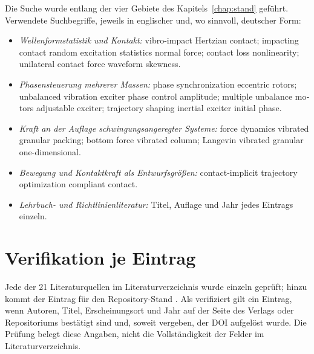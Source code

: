 \documentclass[12pt,a4paper]{report}
\begin{document}
Die Suche wurde entlang der vier Gebiete des Kapitels~\ref{chap:stand}
geführt. Verwendete Suchbegriffe, jeweils in englischer und, wo
sinnvoll, deutscher Form:

\begin{itemize}
\item \emph{Wellenformstatistik und Kontakt:} \foreignlanguage{english}{vibro-impact Hertzian
      contact; impacting contact random excitation statistics normal
      force; contact loss nonlinearity; unilateral contact force
      waveform skewness.}
\item \emph{Phasensteuerung mehrerer Massen:} \foreignlanguage{english}{phase synchronization
      eccentric rotors; unbalanced vibration exciter phase control
      amplitude; multiple unbalance motors adjustable exciter; trajectory
      shaping inertial exciter initial phase.}
\item \emph{Kraft an der Auflage schwingungsangeregter Systeme:} \foreignlanguage{english}{force
      dynamics vibrated granular packing; bottom force vibrated column;
      Langevin vibrated granular one-dimensional.}
\item \emph{Bewegung und Kontaktkraft als Entwurfsgrößen:}
      \foreignlanguage{english}{contact-implicit trajectory optimization compliant contact.}
\item \emph{Lehrbuch- und Richtlinienliteratur:} Titel, Auflage und
      Jahr jedes Eintrags einzeln.
\end{itemize}

\section{Verifikation je Eintrag}

Jede der 21 Literaturquellen im Literaturverzeichnis wurde einzeln
geprüft; hinzu kommt der Eintrag für den Repository-Stand
\cite{frueh2026repo}. Als verifiziert gilt ein Eintrag, wenn Autoren,
Titel, Erscheinungsort und Jahr auf der Seite des Verlags oder
Repositoriums bestätigt sind und, soweit vergeben, der DOI aufgelöst
wurde. Die Prüfung belegt diese Angaben, nicht die Vollständigkeit der
Felder im Literaturverzeichnis.
\end{document}
